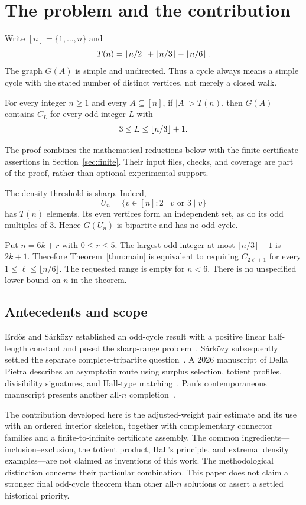 \section{The problem and the contribution}\label{sec:statement}
Write $[n]=\{1,\ldots,n\}$ and
\[
 T(n)=\left\lfloor n/2\right\rfloor+\left\lfloor n/3\right\rfloor-\left\lfloor n/6\right\rfloor.
\]
The graph $G(A)$ is simple and undirected. Thus a cycle always means a simple cycle with the stated number of distinct vertices, not merely a closed walk.

\begin{theorem}\label{thm:main}
For every integer $n\ge1$ and every $A\subseteq[n]$, if $|A|>T(n)$, then $G(A)$ contains $C_L$ for every odd integer $L$ with
\[
3\le L\le\left\lfloor n/3\right\rfloor+1.
\]
\end{theorem}
The proof combines the mathematical reductions below with the finite certificate assertions in Section~\ref{sec:finite}. Their input files, checks, and coverage are part of the proof, rather than optional experimental support.

The density threshold is sharp. Indeed,
\[
 U_n=\{v\in[n]:2\mid v\text{ or }3\mid v\}
\]
has $T(n)$ elements. Its even vertices form an independent set, as do its odd multiples of $3$. Hence $G(U_n)$ is bipartite and has no odd cycle.

Put $n=6k+r$ with $0\le r\le5$. The largest odd integer at most $\lfloor n/3\rfloor+1$ is $2k+1$. Therefore Theorem~\ref{thm:main} is equivalent to requiring $C_{2\ell+1}$ for every $1\le\ell\le\lfloor n/6\rfloor$. The requested range is empty for $n<6$. There is no unspecified lower bound on $n$ in the theorem.

\subsection{Antecedents and scope}
Erd\H{o}s and S\'ark\"ozy established an odd-cycle result with a positive linear half-length constant and posed the sharp-range problem~\cite{ES97}. S\'ark\"ozy subsequently settled the separate complete-tripartite question~\cite{S99}. A 2026 manuscript of Della Pietra describes an asymptotic route using surplus selection, totient profiles, divisibility signatures, and Hall-type matching~\cite{DP26}. Pan's contemporaneous manuscript presents another all-$n$ completion~\cite{Pan26}.

The contribution developed here is the adjusted-weight pair estimate and its use with an ordered interior skeleton, together with complementary connector families and a finite-to-infinite certificate assembly. The common ingredients---inclusion--exclusion, the totient product, Hall's principle, and extremal density examples---are not claimed as inventions of this work. The methodological distinction concerns their particular combination. This paper does not claim a stronger final odd-cycle theorem than other all-$n$ solutions or assert a settled historical priority.

